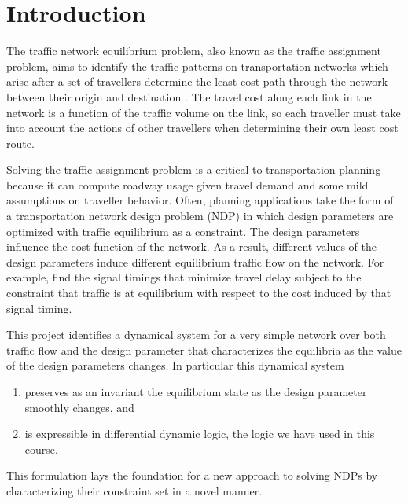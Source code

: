 \section{Introduction}

The traffic network equilibrium problem, also known as the traffic assignment problem, aims to identify the traffic patterns on transportation networks which arise after a set of travellers determine the least cost path through the network between their origin and destination \citep{nagurney2009netecon}.
The travel cost along each link in the network is a function of the traffic volume on the link, so each traveller must take into account the actions of other travellers when determining their own least cost route.

Solving the traffic assignment problem is a critical to transportation planning because it can compute roadway usage given travel demand and some mild assumptions on traveller behavior.
Often, planning applications take the form of a transportation network design problem (NDP) in which design parameters are optimized with traffic equilibrium as a constraint.
The design parameters influence the cost function of the network.
As a result, different values of the design parameters induce different equilibrium traffic flow on the network.
For example, \citet{sheffi1983optimal} find the signal timings that minimize travel delay subject to the constraint that traffic is at equilibrium with respect to the cost induced by that signal timing.

This project identifies a dynamical system for a very simple network over both traffic flow and the design parameter that characterizes the equilibria as the value of the design parameters changes.
In particular this dynamical system 
\begin{enumerate}
    \item preserves as an invariant the equilibrium state as the design parameter smoothly changes, and 
    \item is expressible in differential dynamic logic, the logic we have used in this course.
\end{enumerate}

This formulation lays the foundation for a new approach to solving NDPs by characterizing their constraint set in a novel manner.\\

